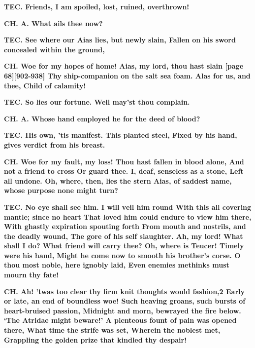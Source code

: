 \documentclass[11pt,letter]{book}
\begin{document}
\par \textbf{TEC. Friends, I am spoiled, lost, ruined, overthrown!}
\par 

\par \textbf{CH. A. What ails thee now?}
\par 

\par \textbf{TEC. See where our Aias lies, but newly slain, Fallen on his sword concealed within the ground,}
\par 

\par \textbf{CH. Woe for my hopes of home! Aias, my lord, thou hast slain [page 68][902-938] Thy ship-companion on the salt sea foam. Alas for us, and thee, Child of calamity!}
\par 

\par \textbf{TEC. So lies our fortune. Well may’st thou complain.}
\par 

\par \textbf{CH. A. Whose hand employed he for the deed of blood?}
\par 

\par \textbf{TEC. His own, ’tis manifest. This planted steel, Fixed by his hand, gives verdict from his breast.}
\par 

\par \textbf{CH. Woe for my fault, my loss! Thou hast fallen in blood alone, And not a friend to cross Or guard thee. I, deaf, senseless as a stone, Left all undone. Oh, where, then, lies the stern Aias, of saddest name, whose purpose none might turn?}
\par 

\par \textbf{TEC. No eye shall see him. I will veil him round With this all covering mantle; since no heart That loved him could endure to view him there, With ghastly expiration spouting forth From mouth and nostrils, and the deadly wound, The gore of his self slaughter. Ah, my lord! What shall I do? What friend will carry thee? Oh, where is Teucer! Timely were his hand, Might he come now to smooth his brother’s corse. O thou most noble, here ignobly laid, Even enemies methinks must mourn thy fate!}
\par 

\par \textbf{CH. Ah! ’twas too clear thy firm knit thoughts would fashion,2 Early or late, an end of boundless woe! Such heaving groans, such bursts of heart-bruised passion, Midnight and morn, bewrayed the fire below. ‘The Atridae might beware!’ A plenteous fount of pain was opened there, What time the strife was set, Wherein the noblest met, Grappling the golden prize that kindled thy despair!}
\par 
\end{document}

